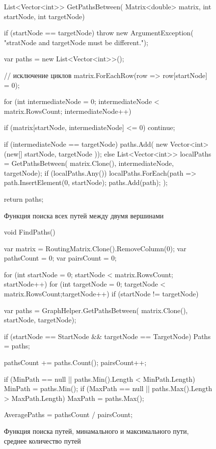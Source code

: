 \documentclass[oneside, draft, 14pt, a4paper]{extreport}
\begin{document}
\begin{figure}[h!]
	\begin{listing}{1}
List<Vector<int>> GetPathsBetween(
  Matrix<double> matrix, int startNode, int targetNode)
{
  if (startNode == targetNode)
  throw new ArgumentException(
  "stratNode and targetNode must be different.");

  var paths = new List<Vector<int>>();

  // исключение циклов
  matrix.ForEachRow(row => row[startNode] = 0);

  for (int intermediateNode = 0;
  intermediateNode < matrix.RowsCount; intermediateNode++)
  {
	if (matrix[startNode, intermediateNode] <= 0)
	  continue;

	if (intermediateNode == targetNode)
	  paths.Add(
	  new Vector<int>(new[] { startNode, targetNode }));
	else
	{
	  List<Vector<int>> localPaths = GetPathsBetween(
	  matrix.Clone(), intermediateNode, targetNode);
	  if (localPaths.Any())
		localPaths.ForEach(path =>
	  	{
		  path.InsertElement(0, startNode);
		  paths.Add(path);
	  	});
	  }
    }

  return paths;
}\end{listing}

	\caption{Функция поиска всех путей между двумя вершинами}
	\label{pic:function_getPathsBetween}
\end{figure}

\begin{figure}[h!]
	\begin{listing}{1}
void FindPaths()
{
  var matrix = RoutingMatrix.Clone().RemoveColumn(0);
  var pathsCount = 0;
  var pairsCount = 0;

  for (int startNode = 0; startNode < matrix.RowsCount;
  	startNode++)
	for (int targetNode = 0;
	targetNode < matrix.RowsCount;targetNode++)
	  if (startNode != targetNode)
	  {	
		var paths = GraphHelper.GetPathsBetween(
		  matrix.Clone(), startNode, targetNode);

		if (startNode == StartNode
		  && targetNode == TargetNode)
		    Paths = paths;

		pathsCount += paths.Count();
		pairsCount++;							

		if (MinPath == null
		  || paths.Min().Length < MinPath.Length)
		    MinPath = paths.Min();
		if (MaxPath == null
		  || paths.Max().Length > MaxPath.Length)
		    MaxPath = paths.Max();
	  }

  AveragePaths = pathsCount / pairsCount;
}\end{listing}

	\caption{Функция поиска путей, минамального и максимального пути, среднее количество путей}
	\label{pic:function_findPaths}
\end{figure}
\end{document}
